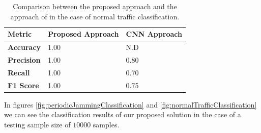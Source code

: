 \documentclass[futureinternet,article,submit,pdftex,moreauthors]{Definitions/mdpi}
\begin{document}
\begin{table}[H]
	\caption{Comparison between the proposed approach and the approach of \cite{JammingDetectionIoT-Hussain} in the case of normal traffic classification.}\label{tab:normal_traffic_comparison}
	\begin{tabularx}{\textwidth}{CCC}
	\toprule
	\textbf{Metric} & \textbf{Proposed Approach} & \textbf{CNN Approach} \\
	\midrule
	\textbf{Accuracy}  & 1.00 & N.D \\
	\textbf{Precision} & 1.00 & 0.80 \\
	\textbf{Recall}    & 1.00 & 0.70 \\
	\textbf{F1 Score}  & 1.00 & 0.75 \\
	\bottomrule
	\end{tabularx}
\end{table}

In figures \ref{fig:periodicJammingClassification} and \ref{fig:normalTrafficClassification} we can see the classification results of our proposed solution in the case of a testing sample size of $10000$ samples.
\end{document}
